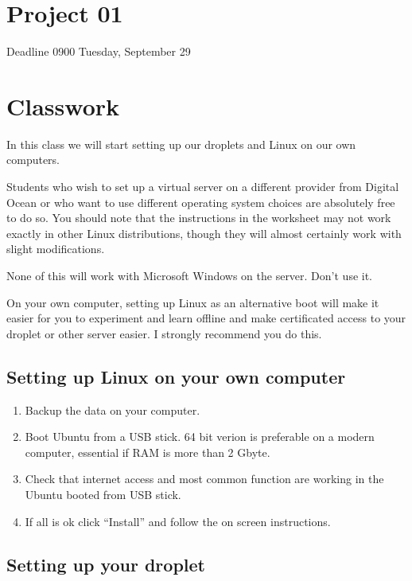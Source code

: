 \documentclass[12pt,a4paper]{article}
\begin{document}

\section*{Project 01} 
Deadline 0900 Tuesday, September 29

\section*{Classwork}
In this class we will start setting up our droplets and Linux on our own 
computers.

Students who wish to set up a virtual server on a different provider from 
Digital Ocean or who want to use different operating system choices are 
absolutely free to do so. You should note that the instructions in the worksheet may not work exactly in other Linux distributions, though they will almost certainly work with slight modifications.

None of this will work with Microsoft Windows on the server. Don't use it.

On your own computer, setting up Linux as an alternative boot will make it easier for you to experiment and learn offline and make certificated access to your droplet or other server easier. I strongly recommend you do this. 

\subsection*{Setting up Linux on your own computer}
\begin{enumerate}
 \item Backup the data on your computer.
 \item Boot Ubuntu from a USB stick. 64 bit verion is preferable on a modern computer,
  essential if RAM is more than 2 Gbyte.
 \item Check that internet access and most common function are working in the Ubuntu booted from USB stick.
 \item If all is ok click ``Install'' and follow the on screen instructions.
\end{enumerate}

\subsection*{Setting up your droplet}
\end{document}
